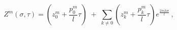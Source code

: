 \begin{equation}
     Z^m(\sigma, \tau) = \left(z^m_0 + \frac{p^m_0}{l} \tau \right)
            \; + \;
            \sum_{k \neq  0}\left(z^m_k + \frac{p^m_k}{l}\tau \right)
            e^{\textstyle{\frac{2\pi i k \sigma}{l}}} \ ,
\end{equation}


